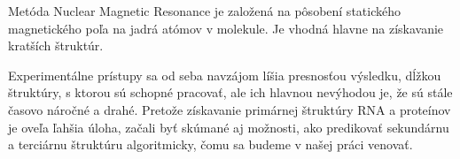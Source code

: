 \indent Metóda Nuclear Magnetic Resonance je založená na pôsobení statického magnetického poľa na jadrá atómov v molekule. Je vhodná hlavne na získavanie kratších štruktúr.


\indent Experimentálne prístupy sa od seba navzájom líšia presnosťou výsledku, dĺžkou štruktúry, s ktorou sú schopné pracovať, ale ich hlavnou nevýhodou je, že sú stále časovo náročné a drahé. Pretože získavanie primárnej štruktúry RNA a proteínov je oveľa ľahšia úloha, začali byť skúmané aj možnosti, ako predikovať sekundárnu a terciárnu štruktúru algoritmicky, čomu sa budeme v našej práci venovať.